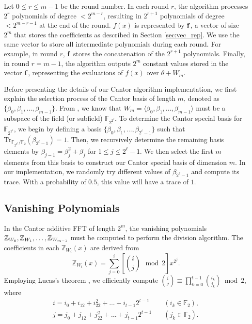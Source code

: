 Let $0 \leq r \leq m-1$ be the round number. In each round $r$, the algorithm processes $2^r$ polynomials of degree $< 2^{m-r}$, resulting in $2^{r+1}$ polynomials of degree $< 2^{m-r-1}$ at the end of the round. $f(x)$ is represented by ${\bf{f}}$, a vector of size $2^m$ that stores the coefficients as described in Section \ref{sec:vec_rep}. We use the same vector to store all intermediate polynomials during each round. For example, in round $r$, ${\bf{f}}$ stores the concatenation of  the $2^{r+1}$ polynomials. Finally, in round $r = m-1$, the algorithm outputs $2^m$ constant values stored in the vector ${\bf{f}}$, representing the evaluations of $f(x)$ over $\theta + W_m$. 

Before presenting the details of our Cantor algorithm implementation, we first explain the selection process of the Cantor basis of length $m$, denoted as $\{\beta_0, \beta_1, \ldots, \beta_{m-1}\}$. From \cite[Appendix]{Gao2010FFT}, we know that $W_m = \langle \beta_0, \beta_1, \ldots, \beta_{m-1} \rangle$ must be a subspace of the field (or subfield) $\mathbb{F}_{2^{2^\ell}}$. To determine the Cantor special basis for $\mathbb{F}_{2^{2^\ell}}$, we begin by defining a basis $\{\beta_0, \beta_1, \ldots, \beta_{2^\ell-1}\}$ such that $\text{Tr}_{\mathbb{F}_{2^{2^\ell}}/\mathbb{F}_2}(\beta_{2^\ell-1}) = 1$. Then, we recursively determine the remaining basis elements by $\beta_{j-1} = \beta_j^2 + \beta_j$ for $1 \leq j \leq 2^\ell-1$. We then select the first $m$ elements from this basis to construct our Cantor special basis of dimension $m$. In our implementation, we randomly try different values of $\beta_{2^\ell-1}$ and compute its trace. With a probability of $0.5$, this value will have a trace of $1$.


\subsection{Vanishing Polynomials}
\label{sec:Vanishing Polynomials}
In the Cantor additive FFT of length $2^m$, the vanishing polynomials $\splitatcommas{\mathbb{Z}_{W_{0}}, \mathbb{Z}_{W_{1}}, \ldots, \mathbb{Z}_{W_{m-1}}}$ must be computed to perform the division algorithm. The coefficients in each $\mathbb{Z}_{W_{i}}(x)$ are derived from
\[
\mathbb{Z}_{W_{i}}(x) = \sum_{j=0}^{i} \left[{i \choose j} \mod 2\right] x^{2^j}.
\]
Employing Lucas's theorem \cite{Lucas1878}, we efficiently compute
$
{i \choose j} \equiv \prod_{k=0}^{t-1} {i_k \choose j_k} \bmod 2,
$
where 
\[
\begin{aligned}
	i = i_0 + i_12 + i_22^2 + \ldots + i_{t-1}2^{t-1} \quad &(i_k \in \mathbb{F}_2), \\
	j = j_0 + j_12 + j_22^2 + \ldots + j_{t-1}2^{t-1} \quad &(j_k \in \mathbb{F}_2).\\
\end{aligned}
\]

